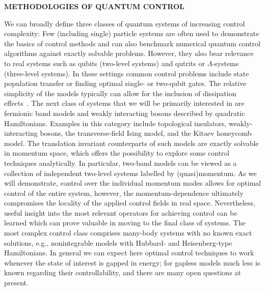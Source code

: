 \begin{center}
{\bf METHODOLOGIES OF QUANTUM CONTROL}
\end{center}
We can broadly define three classes of quantum systems of increasing control complexity: Few (including single) particle systems are often used to demonstrate the basics of control methods and can also benchmark numerical quantum control algorithms against exactly solvable problems. However, they also bear relevance to real systems such as qubits (two-level systems) and qutrits or $\Lambda$-systems (three-level systems). In these settings common control problems include state population transfer or finding optimal single- or two-qubit gates. The relative simplicity of the models typically can allow for the inclusion of dissipation effects~\cite{Koch2016OpenSys}. The next class of systems that we will be primarily interested in are fermionic band models and weakly interacting bosons described by quadratic Hamiltonians. Examples in this category include topological insulators, weakly-interacting bosons, the transverse-field Ising model, and the Kitaev honeycomb model. The translation invariant counterparts of such models are exactly solvable in momentum space, which offers the possibility to explore some control techniques analytically. In particular, two-band models can be viewed as a collection of independent two-level systems labelled by (quasi)momentum. As we will demonstrate, control over the individual momentum modes allows for optimal control of the entire system, however, the momentum-dependence ultimately compromises the locality of the applied control fields in real space. Nevertheless, useful insight into the most relevant operators for achieving control can be learned which can prove valuable in moving to the final class of systems. The most complex control class comprises many-body systems with no known exact solutions, e.g., nonintegrable models with Hubbard- and Heisenberg-type Hamiltonians. In general we can expect here optimal control techniques to work whenever the state of interest is gapped in energy; for gapless models much less is known regarding their controllability, and there are many open questions at present.

